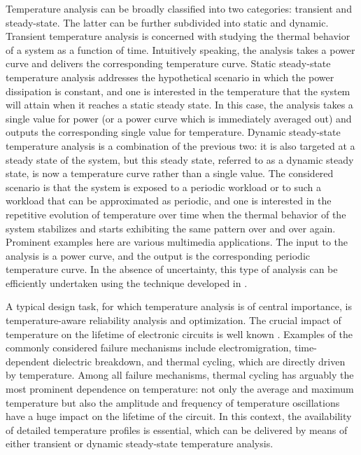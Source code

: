 Temperature analysis can be broadly classified into two categories: transient
and steady-state. The latter can be further subdivided into static and dynamic.
Transient temperature analysis is concerned with studying the thermal behavior
of a system as a function of time. Intuitively speaking, the analysis takes a
power curve and delivers the corresponding temperature curve. Static
steady-state temperature analysis addresses the hypothetical scenario in which
the power dissipation is constant, and one is interested in the temperature that
the system will attain when it reaches a static steady state. In this case, the
analysis takes a single value for power (or a power curve which is immediately
averaged out) and outputs the corresponding single value for temperature.
Dynamic steady-state temperature analysis is a combination of the previous two:
it is also targeted at a steady state of the system, but this steady state,
referred to as a dynamic steady state, is now a temperature curve rather than a
single value. The considered scenario is that the system is exposed to a
periodic workload or to such a workload that can be approximated as periodic,
and one is interested in the repetitive evolution of temperature over time when
the thermal behavior of the system stabilizes and starts exhibiting the same
pattern over and over again. Prominent examples here are various multimedia
applications. The input to the analysis is a power curve, and the output is the
corresponding periodic temperature curve. In the absence of uncertainty, this
type of analysis can be efficiently undertaken using the technique developed in
.

A typical design task, for which temperature analysis is of central importance,
is temperature-aware reliability analysis and optimization. The crucial impact
of temperature on the lifetime of electronic circuits is well known
\cite{jedec2016}. Examples of the commonly considered failure mechanisms include
electromigration, time-dependent dielectric breakdown, and thermal cycling,
which are directly driven by temperature. Among all failure mechanisms, thermal
cycling has arguably the most prominent dependence on temperature: not only the
average and maximum temperature but also the amplitude and frequency of
temperature oscillations have a huge impact on the lifetime of the circuit. In
this context, the availability of detailed temperature profiles is essential,
which can be delivered by means of either transient or dynamic steady-state
temperature analysis.

